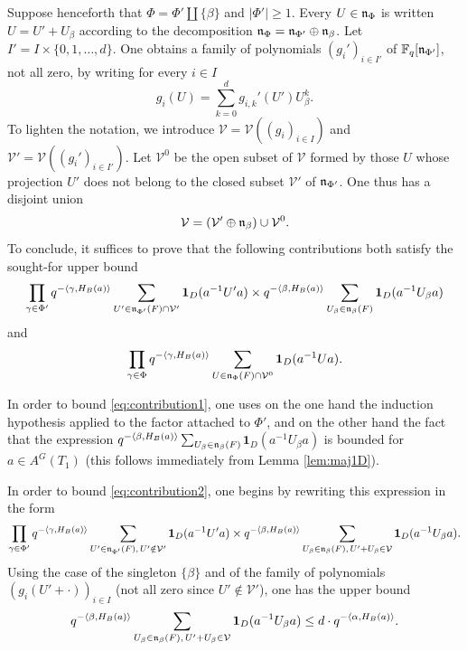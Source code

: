 \begin{paragr}
\begin{preuve}
Suppose henceforth that $\Phi=\Phi'\coprod \{\beta\}$ and $|\Phi'|\geq 1$. Every $U\in \mathfrak{n}_\Phi$ is written $U=U'+U_\beta$ according to the decomposition $\mathfrak{n}_\Phi=\mathfrak{n}_{\Phi'}\oplus \mathfrak{n}_\beta$. Let $I'=I\times \{0,1,\ldots,d\}$. One obtains a family of polynomials $(g_i')_{i\in I'}$ of $\mathbb{F}_q[\mathfrak{n}_{\Phi'}]$, not all zero, by writing for every $i\in I$
$$g_i(U)=\sum_{k=0}^d g_{i,k}'(U')U_\beta^k.$$
To lighten the notation, we introduce $\mathcal{V}=\mathcal{V}((g_i)_{i\in I})$ and $\mathcal{V}'=\mathcal{V}((g_i')_{i\in I'})$. Let $\mathcal{V}^0$ be the open subset of $\mathcal{V}$ formed by those $U$ whose projection $U'$ does not belong to the closed subset $\mathcal{V}'$ of $\mathfrak{n}_{\Phi'}$. One thus has a disjoint union
$$\mathcal{V}=(\mathcal{V}'\oplus \mathfrak{n}_\beta)\cup \mathcal{V}^0.$$
To conclude, it suffices to prove that the following contributions both satisfy the sought-for upper bound
\begin{equation}
  \label{eq:contribution1}
  \prod_{\gamma\in \Phi'} q^{-\langle \gamma,H_B(a)\rangle} \sum_{U'\in \mathfrak{n}_{\Phi'}(F)\cap \mathcal{V}'} \mathbf{1}_D(a^{-1}U'a)\times q^{-\langle \beta,H_B(a)\rangle} \sum_{U_\beta\in \mathfrak{n}_\beta(F)} \mathbf{1}_D(a^{-1}U_\beta a)
\end{equation}
and
\begin{equation}
  \label{eq:contribution2}
  \prod_{\gamma\in \Phi} q^{-\langle \gamma,H_B(a)\rangle} \sum_{U\in \mathfrak{n}_\Phi(F)\cap \mathcal{V}^0} \mathbf{1}_D(a^{-1}Ua).
\end{equation}

In order to bound \eqref{eq:contribution1}, one uses on the one hand the induction hypothesis applied to the factor attached to $\Phi'$, and on the other hand the fact that the expression \(q^{-\langle \beta,H_B(a)\rangle}\sum_{U_\beta\in \mathfrak{n}_\beta(F)}\)\allowbreak\(\mathbf{1}_D(a^{-1}U_\beta a)\) is bounded for $a\in A^G(T_1)$ (this follows immediately from Lemma \ref{lem:maj1D}).

In order to bound \eqref{eq:contribution2}, one begins by rewriting this expression in the form
$$\prod_{\gamma\in \Phi'} q^{-\langle \gamma,H_B(a)\rangle} \sum_{U'\in \mathfrak{n}_{\Phi'}(F),\, U'\notin \mathcal{V}'} \mathbf{1}_D(a^{-1}U'a)\times q^{-\langle \beta,H_B(a)\rangle} \sum_{U_\beta\in \mathfrak{n}_\beta(F),\, U'+U_\beta\in \mathcal{V}} \mathbf{1}_D(a^{-1}U_\beta a).$$
Using the case of the singleton $\{\beta\}$ and of the family of polynomials $(g_i(U'+\cdot))_{i\in I}$ (not all zero since $U'\notin \mathcal{V}'$), one has the upper bound
$$q^{-\langle \beta,H_B(a)\rangle} \sum_{U_\beta\in \mathfrak{n}_\beta(F),\, U'+U_\beta\in \mathcal{V}} \mathbf{1}_D(a^{-1}U_\beta a)\leq d\cdot q^{-\langle \alpha,H_B(a)\rangle}.$$


\end{preuve}
\end{paragr}
